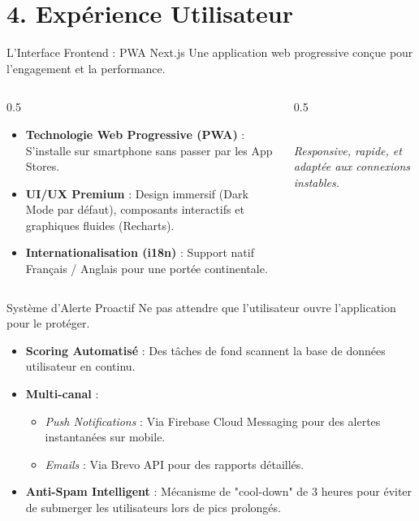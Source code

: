 \documentclass[10pt, aspectratio=169]{beamer}
\begin{document}
\section{4. Expérience Utilisateur}
\begin{frame}{L'Interface Frontend : PWA Next.js}
  Une application web progressive conçue pour l'engagement et la performance.
  \begin{columns}
    \begin{column}{0.5\textwidth}
      \begin{itemize}
        \item \textbf{Technologie Web Progressive (PWA)} : S'installe sur smartphone sans passer par les App Stores.
        \item \textbf{UI/UX Premium} : Design immersif (Dark Mode par défaut), composants interactifs et graphiques fluides (Recharts).
        \item \textbf{Internationalisation (i18n)} : Support natif Français / Anglais pour une portée continentale.
      \end{itemize}
    \end{column}
    \begin{column}{0.5\textwidth}
      \begin{center}
        \faMobileAlt[solid] \hspace{0.5cm} \faLaptop
        \vspace{0.2cm} \\
        \textit{Responsive, rapide, et adaptée aux connexions instables.}
      \end{center}
    \end{column}
  \end{columns}
\end{frame}

\begin{frame}{Système d'Alerte Proactif}
  Ne pas attendre que l'utilisateur ouvre l'application pour le protéger.
  \vspace{0.3cm}
  \begin{itemize}
    \item \textbf{Scoring Automatisé} : Des tâches de fond scannent la base de données utilisateur en continu.
    \item \textbf{Multi-canal} :
      \begin{itemize}
        \item \textit{Push Notifications} : Via Firebase Cloud Messaging pour des alertes instantanées sur mobile.
        \item \textit{Emails} : Via Brevo API pour des rapports détaillés.
      \end{itemize}
    \item \textbf{Anti-Spam Intelligent} : Mécanisme de "cool-down" de 3 heures pour éviter de submerger les utilisateurs lors de pics prolongés.
  \end{itemize}
\end{frame}
\end{document}
